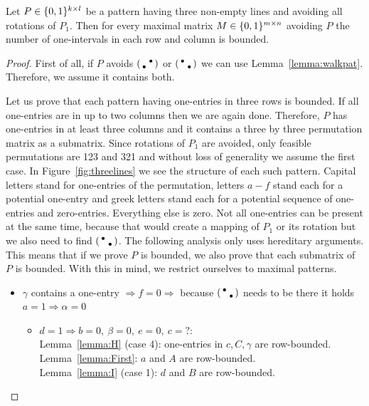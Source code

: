 \begin{lemma}
Let $P\in\{0,1\}^{k\times l}$ be a pattern having three non-empty lines and avoiding all rotations of $P_1$. Then for every maximal matrix $M\in\{0,1\}^{m\times n}$ avoiding $P$ the number of one-intervals in each row and column is bounded. 
\end{lemma}
\begin{proof}
First of all, if $P$ avoids $\left(\begin{smallmatrix} &\bullet\\\bullet& \end{smallmatrix}\right)$ or $\left(\begin{smallmatrix}\bullet& \\ &\bullet\end{smallmatrix}\right)$ we can use Lemma~\ref{lemma:walkpat}. Therefore, we assume it contains both.

Let us prove that each pattern having one-entries in three rows is bounded. If all one-entries are in up to two columns then we are again done. Therefore, $P$ has one-entries in at least three columns and it contains a three by three permutation matrix as a submatrix. Since rotations of $P_1$ are avoided, only feasible permutations are 123 and 321 and without loss of generality we assume the first case. In Figure~\ref{fig:threelines} we see the structure of each such pattern. Capital letters stand for one-entries of the permutation, letters $a-f$ stand each for a potential one-entry and greek letters stand each for a potential sequence of one-entries and zero-entries. Everything else is zero. Not all one-entries can be present at the same time, because that would create a mapping of $P_1$ or its rotation but we also need to find $\left(\begin{smallmatrix}\bullet& \\ &\bullet\end{smallmatrix}\right)$. The following analysis only uses hereditary arguments. This means that if we prove $P$ is bounded, we also prove that each submatrix of $P$ is bounded. With this in mind, we restrict ourselves to maximal patterns.
\begin{itemize}
	\item $\gamma$ contains a one-entry $\Rightarrow f=0\Rightarrow$ because $\left(\begin{smallmatrix}\bullet& \\ &\bullet\end{smallmatrix}\right)$ needs to be there it holds $a=1\Rightarrow\alpha=0$
		\begin{itemize}
			\item $d=1\Rightarrow b=0,\ \beta=0,\ e=0,\ c=?$:\\
				Lemma~\ref{lemma:H} (case 4): one-entries in $c,C,\gamma$ are row-bounded.\\
				Lemma~\ref{lemma:First}: $a$ and $A$ are row-bounded.\\
				Lemma~\ref{lemma:I} (case 1): $d$ and $B$ are row-bounded.\\
				

\end{itemize}
\end{itemize}
\end{proof}
